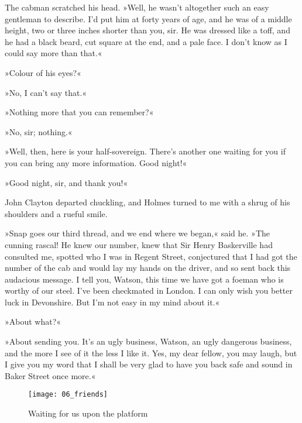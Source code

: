 The cabman scratched his head. »Well, he wasn't altogether such an easy gentleman to describe. I'd put him at forty years of age, and he was of a middle height, two or three inches shorter than you, sir. He was dressed like a toff, and he had a black beard, cut square at the end, and a pale face. I don't know as I could say more than that.«

»Colour of his eyes?«

»No, I can't say that.«

»Nothing more that you can remember?«

»No, sir; nothing.«

»Well, then, here is your half-sovereign. There's another one waiting for you if you can bring any more information. Good night!«

»Good night, sir, and thank you!«

John Clayton departed chuckling, and Holmes turned to me with a shrug of his shoulders and a rueful smile.

»Snap goes our third thread, and we end where we began,« said he. »The cunning rascal! He knew our number, knew that Sir Henry Baskerville had consulted me, spotted who I was in Regent Street, conjectured that I had got the number of the cab and would lay my hands on the driver, and so sent back this audacious message. I tell you, Watson, this time we have got a foeman who is worthy of our steel. I've been checkmated in London. I can only wish you better luck in Devonshire. But I'm not easy in my mind about it.«

»About what?«

»About sending you. It's an ugly business, Watson, an ugly dangerous business, and the more I see of it the less I like it. Yes, my dear fellow, you may laugh, but I give you my word that I shall be very glad to have you back safe and sound in Baker Street once more.«

\makeatletter
{}
{%
}{%
	\begin{figure}[p]
	\centering
	\texttt{[image: 06\_friends]}
	\caption{Waiting for us upon the platform}
	\end{figure}
}
\makeatother
